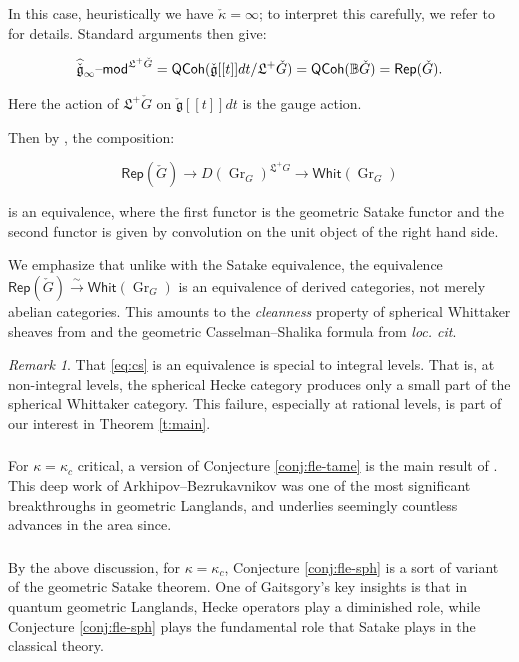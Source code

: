 \documentclass[11pt,reqno]{amsart}
\newcommand{\fL}{\mathfrak{L}}
\newcommand{\Gr}{\operatorname{Gr}}
\newcommand{\fg}{\mathfrak{g}}
\theoremstyle{remark}
\newtheorem{re}[subsubsection]{Remark}
\numberwithin{equation}{section}
\newcommand{\cG}{\check{G}}
\renewcommand{\mod}{\text{\textendash}\mathsf{mod}}
\newcommand{\Whit}{\mathsf{Whit}}
\newcommand{\QCoh}{\mathsf{QCoh}}
\newcommand{\Rep}{\mathsf{Rep}}
\newcommand{\xar}[1]{\xrightarrow{#1}}
\begin{document}
In this case, heuristically we have
$\check{\kappa} = \infty$;
to interpret this carefully, we refer to
\cite{yifei} for details. Standard arguments then give:

\[
\widehat{\check{\fg}}_{\infty}\mod^{\fL^+ \cG} =
\QCoh(\check{\fg}[[t]]dt/\fL^+ \cG) = \QCoh(\mathbb{B} \cG) =
\Rep(\cG).
\]

\noindent Here the action of $\fL^+ \cG$ on 
$\check{\fg}[[t]]dt$ is the gauge action. 

Then by \cite{fgv}, the composition:

\begin{equation}\label{eq:cs}
\Rep(\cG) \to D(\Gr_G)^{\fL^+ G} \to \Whit(\Gr_G)
\end{equation}

\noindent is an equivalence, where the first functor
is the geometric Satake functor \cite{mirkovic-vilonen}
and the second functor is given by convolution
on the unit object of the right hand side.

We emphasize that unlike with the Satake equivalence,
the equivalence $\Rep(\cG) \xar{\sim} \Whit(\Gr_G)$ is
an equivalence of derived categories, not merely
abelian categories. This amounts to the \emph{cleanness}
property of spherical Whittaker sheaves from \cite{fgv}
and the geometric Casselman--Shalika formula from
\emph{loc. cit}.


\begin{re}
That \eqref{eq:cs} is an equivalence is special to 
integral levels. 
That is, at non-integral levels, the spherical Hecke
category produces only a small part of the spherical Whittaker 
category. This failure, especially at rational levels, is 
part of our interest in Theorem \ref{t:main}.
\end{re}

\subsubsection{}
	
	For $\kappa = \kappa_c$ critical, a version of Conjecture 
	\ref{conj:fle-tame} 
	is the main result of \cite{arkhipov-bezrukavnikov}.
	This deep work of Arkhipov--Bezrukavnikov was
	one of the most significant breakthroughs in geometric
	Langlands, and underlies seemingly countless
	advances in the area since. %

\subsubsection{}
By the above discussion, for $\kappa = \kappa_c$, Conjecture \ref{conj:fle-sph}
is a sort of variant of the geometric Satake theorem. One of 
Gaitsgory's key insights is that in quantum geometric Langlands,
Hecke operators play a diminished role, while Conjecture \ref{conj:fle-sph} 
plays the fundamental role that Satake plays in the classical theory.
\end{document}
